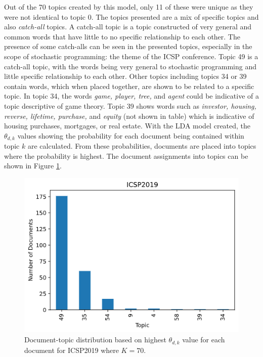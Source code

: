 \documentclass[a4paper, 12pt, twoside]{article}
\numberwithin{equation}{section} %
\begin{document}
Out of the 70 topics created by this model, only 11 of these were unique as they were not identical to topic 0. The topics presented are a mix of specific topics and also \textit{catch-all} topics. A catch-all topic is a topic constructed of very general and common words that have little to no specific relationship to each other. The presence of some catch-alls can be seen in the presented topics, especially in the scope of stochastic programming: the theme of the ICSP conference. Topic 49 is a catch-all topic, with the words being very general to stochastic programming and little specific relationship to each other. Other topics including topics 34 or 39 contain words, which when placed together, are shown to be related to a specific topic. In topic 34, the words \textit{game, player, tree,} and \textit{agent} could be indicative of a topic descriptive of game theory. Topic 39 shows words such as \textit{investor, housing, reverse, lifetime, purchase,} and \textit{equity} (not shown in table) which is indicative of housing purchases, mortgages, or real estate. With the LDA model created, the $\theta_{d,k}$ values showing the probability for each document being contained within topic $k$ are calculated. From these probabilities, documents are placed into topics where the probability is highest. The document assignments into topics can be shown in Figure \ref{fig:ICSP2019 varied K placements}.

\begin{figure}[H]

  \centering
  \includegraphics[width=0.65\linewidth]{ICSP_placement.png}
\caption[ICSP2019 varied K document-topic distribution]{Document-topic distribution based on highest $\theta_{d,k}$ value for each document for ICSP2019 where $K = 70$.}
\label{fig:ICSP2019 varied K placements}
\end{figure}
\end{document}

